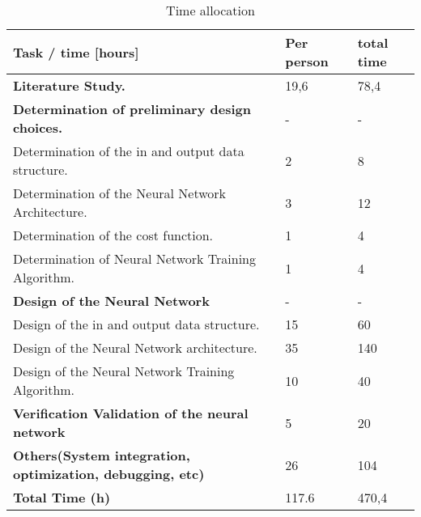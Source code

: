 \begin{table}[h]
	\centering
	\caption{Time allocation}
	\label{tab:timeallocation}
	\begin{tabular}{|l|l|l|} \hline
		Task / time [hours]                                               			& Per person & total time \\ \hline
		\textbf{Literature Study.}                                 			& 19,6    & 78,4          \\
		\textbf{Determination of preliminary design choices.}      			&   -     & -             \\
		Determination of the in and output data structure.         			& 2       & 8             \\
		Determination of the Neural Network Architecture.          			& 3       & 12            \\
		Determination of the cost function.                        			& 1       & 4             \\
		Determination of Neural Network Training Algorithm.         		& 1       & 4             \\
		\textbf{Design of the Neural Network}                      			& -       &  -            \\
		Design of the in and output data structure.                			& 15      & 60            \\
		Design of the Neural Network architecture.                 			& 35      & 140           \\
		Design of the Neural Network Training Algorithm.          			& 10      & 40            \\
		\textbf{Verification  Validation of the neural network}          	& 5       & 20            \\
		\textbf{Others(System integration, optimization, debugging, etc)} 	& 26      & 104           \\
		\textbf{Total Time (h)}                                             & 117.6   & 470,4         \\ \hline
	\end{tabular}
\end{table}

